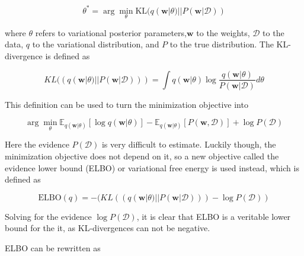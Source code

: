	\begin{equation}
		\label{eq:kl}
		\theta^* = \arg \min_{\theta} \text{KL}
		(
		q(\pmb{w}|\theta) 
		||
		P(\pmb{w}|\mathcal{D})
		)
	\end{equation}
	
	where $\theta$ refers to variational posterior parameters,$\pmb{w}$ to the weights, $\mathcal{D}$ to the data, $q$ to the variational distribution, and $P$ to the true distribution. The KL-divergence is defined as
	
	\begin{equation}
		KL((q(\pmb{w}|\theta) ||P(\pmb{w}|\mathcal{D}))) = \int q(\pmb{w}|\theta) \log \frac{q(\pmb{w}|\theta)}{P(\pmb{w}|\mathcal{D})} d\theta
	\end{equation}
	
	This definition can be used to turn the minimization objective into 
	
	\begin{equation}
		\arg \min_{\theta}
		\mathbb{E}_{q(\pmb{w}|\theta)}[\log q(\pmb{w}|\theta)] -
		\mathbb{E}_{q(\pmb{w}|\theta)}[P(\pmb{w},\mathcal{D})] + 
		\log P(\mathcal{D})
	\end{equation} 
	
	 Here the evidence $P(\mathcal{D})$ is very difficult to estimate. Luckily though, the minimization objective does not depend on it, so a new objective called the evidence lower bound (ELBO) or variational free energy is used instead, which is defined as 
	 
	 \begin{equation}
	 	\text{ELBO}(q) = -(KL((q(\pmb{w}|\theta) ||P(\pmb{w}|\mathcal{D}))) - \log P(\mathcal{D}))
	 \end{equation}
	 
	 Solving for the evidence $\log P(\mathcal{D})$, it is clear that ELBO is a veritable lower bound for the it, as KL-divergences can not be negative.  

	ELBO can be rewritten as
	
